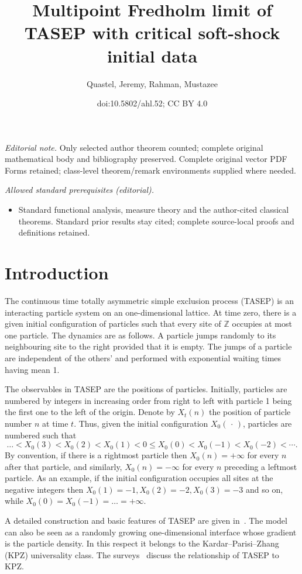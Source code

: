\documentclass[10pt]{amsart}
\title{Multipoint Fredholm limit of TASEP with critical soft-shock initial data}
\author{Quastel, Jeremy, Rahman, Mustazee}
\date{doi:10.5802/ahl.52; CC BY 4.0}
\theoremstyle{definition}\newtheorem{defi}[theo]{Definition}\newtheorem{rema}[theo]{Remark}\newtheorem{exam}[theo]{Example}\newtheorem{exem}[theo]{Example}\newtheorem{nota}[theo]{Notation}
\newcommand{\Z}{\mathbb{Z}}
\begin{document}
\maketitle
\noindent\textit{Editorial note.} Only selected author theorem counted; complete original mathematical body and bibliography preserved. Complete original vector PDF Forms retained; class-level theorem/remark environments supplied where needed.\par\medskip
\noindent\textit{Allowed standard prerequisites (editorial).}\begin{itemize}
\item Standard functional analysis, measure theory and the author-cited classical theorems. Standard prior results stay cited; complete source-local proofs and definitions retained.
\end{itemize}\medskip

\section{Introduction}

The continuous time totally asymmetric simple exclusion process (TASEP) is an interacting particle system on an one-dimensional lattice. At time zero, there is a given initial configuration of particles such that every site of $\Z$ occupies at most one particle. The dynamics are as follows. A particle jumps randomly to its neighbouring site to the right provided that it is empty. The jumps of a particle are independent of the others' and performed with exponential waiting times having mean 1.

The observables in TASEP are the positions of particles. Initially, particles are numbered by integers in increasing order from right to left with particle 1 being the first one to the left of the origin. Denote by $X_t(n)$ the position of particle number $n$ at time $t$. Thus, given the initial configuration $X_0({\,\cdot\,})$, particles are numbered such that
\[
\dots < X_0(3) < X_0(2) < X_0(1) < 0 \leq X_0(0) < X_0(-1) < X_0(-2) < \cdots.
\]
By convention, if there is a rightmost particle then $X_0(n) = + \infty$ for every $n$ after that particle, and similarly, $X_0(n) = - \infty$ for every $n$ preceding a leftmost particle. As an example, if the initial configuration occupies all sites at the negative integers then $X_0(1) = -1, X_0(2) = -2, X_0(3) = -3$ and so on, while $X_0(0) = X_0(-1)= \dots = + \infty$.

A detailed construction and basic features of TASEP are given in~\cite{Lig}. The model can also be seen as a randomly growing one-dimensional interface whose gradient is the particle density. In this respect it belongs to the Kardar--Parisi--Zhang (KPZ) universality class. The surveys~\cite{BG, Q} discuss the relationship of TASEP to KPZ.
\end{document}
